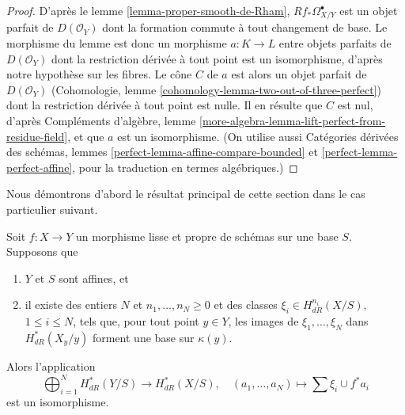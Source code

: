 \begin{proof}
D'après le lemme \ref{lemma-proper-smooth-de-Rham},
$Rf_*\Omega^\bullet_{X/Y}$ est un objet parfait de $D(\mathcal{O}_Y)$
dont la formation commute à tout changement de base.
Le morphisme du lemme est donc un morphisme $a : K \to L$
entre objets parfaits de $D(\mathcal{O}_Y)$
dont la restriction dérivée à tout point est un isomorphisme,
d'après notre hypothèse sur les fibres. Le cône $C$ de $a$ est alors un objet parfait
de $D(\mathcal{O}_Y)$ (Cohomologie, lemme
\ref{cohomology-lemma-two-out-of-three-perfect}) dont
la restriction dérivée à tout point est nulle. Il en résulte que $C$
est nul, d'après Compléments d'algèbre, lemme
\ref{more-algebra-lemma-lift-perfect-from-residue-field},
et que $a$ est un isomorphisme. (On utilise aussi Catégories dérivées des schémas,
lemmes \ref{perfect-lemma-affine-compare-bounded} et
\ref{perfect-lemma-perfect-affine}, pour la traduction en termes algébriques.)
\end{proof}

\noindent
Nous démontrons d'abord le résultat principal de cette section dans le
cas particulier suivant.

\begin{lemma}
\label{lemma-global-generation-on-fibres}
Soit $f : X \to Y$ un morphisme lisse et propre de schémas sur une base $S$.
Supposons que
\begin{enumerate}
\item $Y$ et $S$ sont affines, et
\item il existe des entiers $N$ et $n_1, \ldots, n_N \geq 0$ et des classes
$\xi_i \in H^{n_i}_{dR}(X/S)$, $1 \leq i \leq N$, tels que,
pour tout point $y \in Y$, les images de $\xi_1, \ldots, \xi_N$
dans $H^*_{dR}(X_y/y)$ forment une base sur $\kappa(y)$.
\end{enumerate}
Alors l'application
$$
\bigoplus\nolimits_{i = 1}^N H^*_{dR}(Y/S) \longrightarrow
H^*_{dR}(X/S), \quad
(a_1, \ldots, a_N) \longmapsto  \sum \xi_i \cup f^*a_i
$$
est un isomorphisme.
\end{lemma}

